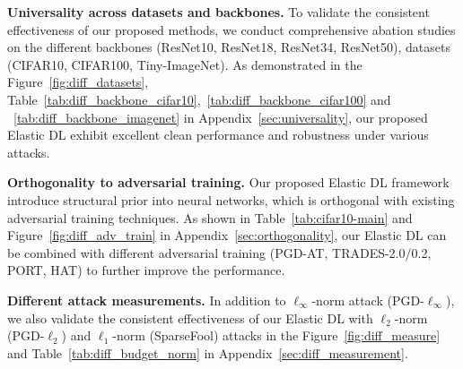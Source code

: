 \textbf{Universality across datasets and backbones.} To validate the consistent effectiveness of our proposed methods, we conduct comprehensive abation studies on the different backbones (ResNet10, ResNet18, ResNet34, ResNet50), datasets (CIFAR10, CIFAR100, Tiny-ImageNet).
As demonstrated in the Figure~\ref{fig:diff_datasets}, Table~\ref{tab:diff_backbone_cifar10},~\ref{tab:diff_backbone_cifar100} and ~\ref{tab:diff_backbone_imagenet} in Appendix~\ref{sec:universality}, our proposed Elastic DL exhibit excellent clean performance and robustness under various attacks.








\textbf{Orthogonality to adversarial training.} Our proposed Elastic DL framework introduce structural prior into neural networks, which is orthogonal with existing adversarial training techniques. As shown in Table~\ref{tab:cifar10-main} and  Figure~\ref{fig:diff_adv_train} in Appendix~\ref{sec:orthogonality}, our Elastic DL can be combined with
different adversarial training (PGD-AT, TRADES-2.0/0.2, PORT, HAT) to further improve the performance.










\textbf{Different attack measurements.} In addition to $\ell_\infty$-norm attack (PGD-$\ell_\infty$), we also validate the consistent effectiveness of our Elastic DL with $\ell_2$-norm (PGD-$\ell_2$) and $\ell_1$-norm (SparseFool) attacks in the Figure~\ref{fig:diff_measure} and  Table~\ref{tab:diff_budget_norm} in Appendix~\ref{sec:diff_measurement}.




